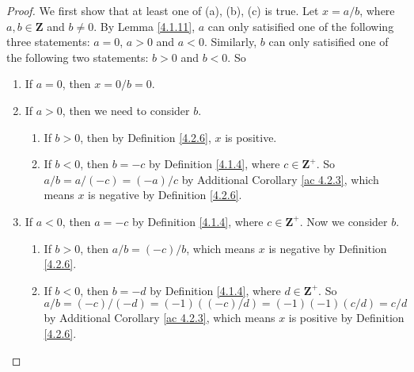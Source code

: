 \begin{proof}
    We first show that at least one of (a), (b), (c) is true.
    Let \(x = a / b\), where \(a, b \in \mathbf{Z}\) and \(b \neq 0\).
    By Lemma \ref{4.1.11}, \(a\) can only satisified one of the following three statements:
    \(a = 0\), \(a > 0\) and \(a < 0\).
    Similarly, \(b\) can only satisified one of the following two statements:
    \(b > 0\) and \(b < 0\).
    So
    \begin{enumerate}[label=(\Roman*)]
        \item If \(a = 0\), then \(x = 0 / b = 0\).
        \item If \(a > 0\), then we need to consider \(b\).
              \begin{enumerate}[label=(\roman*)]
                  \item If \(b > 0\), then by Definition \ref{4.2.6}, \(x\) is positive.
                  \item If \(b < 0\), then \(b = -c\) by Definition \ref{4.1.4}, where \(c \in \mathbf{Z}^+\).
                        So \(a / b = a / (-c) = (-a) / c\) by Additional Corollary \ref{ac 4.2.3}, which means \(x\) is negative by Definition \ref{4.2.6}.
              \end{enumerate}
        \item If \(a < 0\), then \(a = -c\) by Definition \ref{4.1.4}, where \(c \in \mathbf{Z}^+\).
              Now we consider \(b\).
              \begin{enumerate}[label=(\roman*)]
                  \item If \(b > 0\), then \(a / b = (-c) / b\), which means \(x\) is negative by Definition \ref{4.2.6}.
                  \item If \(b < 0\), then \(b = -d\) by Definition \ref{4.1.4}, where \(d \in \mathbf{Z}^+\).
                        So \(a / b = (-c) / (-d) = (-1)((-c) / d) = (-1)(-1)(c / d) = c / d\) by Additional Corollary \ref{ac 4.2.3}, which means \(x\) is positive by Definition \ref{4.2.6}.
              \end{enumerate}
    \end{enumerate}


\end{proof}
